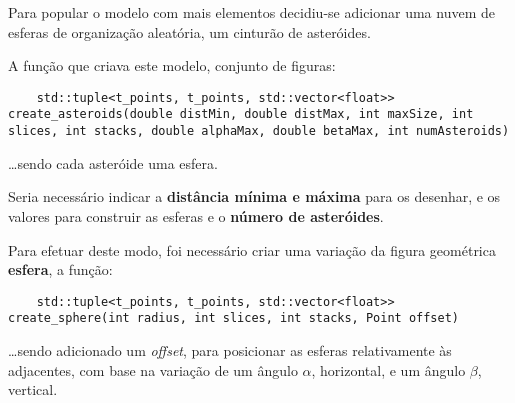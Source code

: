 \documentclass[relatorio.tex]{subfiles}
\begin{document}
Para popular o modelo com mais elementos decidiu-se 
adicionar uma nuvem de esferas de organização aleatória,
um cinturão de asteróides. 

A função que criava este modelo, conjunto de figuras:
\begin{verbatim}
    std::tuple<t_points, t_points, std::vector<float>> create_asteroids(double distMin, double distMax, int maxSize, int slices, int stacks, double alphaMax, double betaMax, int numAsteroids)
\end{verbatim}
\dots sendo cada asteróide uma esfera.

Seria necessário indicar a \textbf{distância mínima e máxima} 
para os desenhar, e os valores para construir as esferas 
e o \textbf{número de asteróides}.

Para efetuar deste modo, foi necessário criar uma variação 
da figura geométrica \textbf{esfera}, a função:

\begin{verbatim}
    std::tuple<t_points, t_points, std::vector<float>> create_sphere(int radius, int slices, int stacks, Point offset)
\end{verbatim}
\dots sendo adicionado um \textit{offset}, para 
posicionar as esferas relativamente às adjacentes,
com base na variação de um ângulo $\alpha$, horizontal,
e um ângulo $\beta$, vertical.
\end{document}
